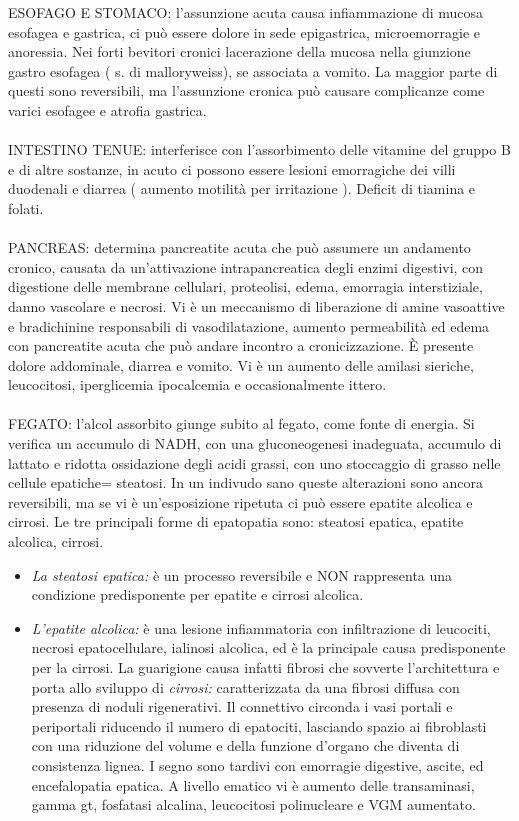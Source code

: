 ESOFAGO E STOMACO: l'assunzione acuta causa infiammazione di mucosa
esofagea e gastrica, ci può essere dolore in sede epigastrica,
microemorragie e anoressia. Nei forti bevitori cronici lacerazione della
mucosa nella giunzione gastro esofagea ( s. di malloryweiss), se
associata a vomito. La maggior parte di questi sono reversibili, ma
l'assunzione cronica può causare complicanze come varici esofagee e
atrofia gastrica.
\\\\
INTESTINO TENUE: interferisce con l'assorbimento delle vitamine del
gruppo B e di altre sostanze, in acuto ci possono essere lesioni
emorragiche dei villi duodenali e diarrea ( aumento motilità per
irritazione ). Deficit di tiamina e folati.
\\\\
PANCREAS: determina pancreatite acuta che può assumere un andamento
cronico, causata da un'attivazione intrapancreatica degli enzimi
digestivi, con digestione delle membrane cellulari, proteolisi, edema,
emorragia interstiziale, danno vascolare e necrosi. Vi è un meccanismo
di liberazione di amine vasoattive e bradichinine responsabili di
vasodilatazione, aumento permeabilità ed edema con pancreatite acuta che
può andare incontro a cronicizzazione. È presente dolore addominale,
diarrea e vomito. Vi è un aumento delle amilasi sieriche, leucocitosi,
iperglicemia ipocalcemia e occasionalmente ittero.
\\\\
FEGATO: l'alcol assorbito giunge subito al fegato, come fonte di
energia. Si verifica un accumulo di NADH, con una gluconeogenesi
inadeguata, accumulo di lattato e ridotta ossidazione degli acidi
grassi, con uno stoccaggio di grasso nelle cellule epatiche= steatosi.
In un indivudo sano queste alterazioni sono ancora reversibili, ma se vi
è un'esposizione ripetuta ci può essere epatite alcolica e cirrosi. Le
tre principali forme di epatopatia sono: steatosi epatica, epatite
alcolica, cirrosi.
\begin{itemize}
\item
\emph{La steatosi epatica:} è un processo reversibile e NON rappresenta
una condizione predisponente per epatite e cirrosi alcolica.
\item
\emph{L'epatite alcolica:} è una lesione infiammatoria con infiltrazione
di leucociti, necrosi epatocellulare, ialinosi alcolica, ed è la
principale causa predisponente per la cirrosi. La guarigione causa
infatti fibrosi che sovverte l'architettura e porta allo sviluppo di
\emph{cirrosi:} caratterizzata da una fibrosi diffusa con presenza di
noduli rigenerativi. Il connettivo circonda i vasi portali e periportali
riducendo il numero di epatociti, lasciando spazio ai fibroblasti con
una riduzione del volume e della funzione d'organo che diventa di
consistenza lignea. I segno sono tardivi con emorragie digestive,
ascite, ed encefalopatia epatica. A livello ematico vi è aumento delle
transaminasi, gamma gt, fosfatasi alcalina, leucocitosi polinucleare e
VGM aumentato.
\end{itemize}

